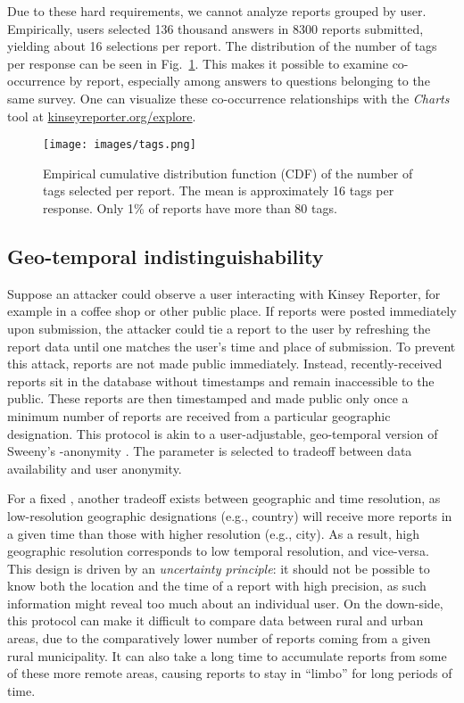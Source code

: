 \documentclass{sigchi}
\begin{document}
Due to these hard requirements, we cannot analyze reports grouped by user. Empirically, users selected 136 thousand answers in 8300 reports submitted, yielding about 16 selections per report. The distribution of the number of tags per response can be seen in Fig.~\ref{fig:cdf-tags}. This makes it possible  to examine co-occurrence by report, especially among answers to questions belonging to the same survey. One can visualize these co-occurrence relationships with the \textit{Charts} tool at \url{kinseyreporter.org/explore}.

\begin{figure}
\texttt{[image: images/tags.png]}
\caption{Empirical cumulative distribution function (CDF) of the number of tags selected per report. The mean is approximately 16 tags per response. Only 1\% of reports have more than 80 tags.}
\label{fig:cdf-tags}
\end{figure}


\subsection{Geo-temporal indistinguishability}

Suppose an attacker could observe a user interacting with Kinsey Reporter, for example in a coffee shop or other public place. If reports were posted immediately upon submission, the attacker could tie a report to the user by refreshing the report data until one matches the user's time and place of submission. To prevent this attack, reports are not made public immediately. Instead, recently-received reports sit in the database without timestamps and remain inaccessible to the public. These reports are then timestamped and made public only once a minimum number  of reports are received from a particular geographic designation.  This protocol is akin to a user-adjustable, geo-temporal version of Sweeny's -anonymity \cite{Sweeny2002}. The  parameter is selected to tradeoff between data availability and user anonymity.

For a fixed , another tradeoff exists between geographic and time resolution, as low-resolution geographic designations (e.g., country) will receive more reports in a given time than those with higher resolution (e.g., city). As a result, high geographic resolution corresponds to low temporal resolution, and vice-versa. This design is driven by an \emph{uncertainty principle}: it should not be possible to know both the location and the time of a report with high precision, as such information might reveal too much about an individual user. On the down-side, this protocol can make it difficult to compare data between rural and urban areas, due to the comparatively lower number of reports coming from a given rural municipality. It can also take a long time to accumulate  reports from some of these more remote areas, causing reports to stay in ``limbo'' for long periods of time.
\end{document}
